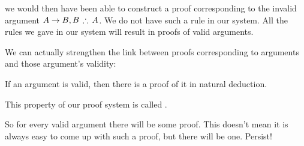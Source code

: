 	we would then have been able to construct a proof corresponding to the invalid argument $A\eif B, B\,\therefore\, A$.
We do not have such a rule in our system. All the rules we gave in our system will result in proofs of valid arguments.


We can actually strengthen the link between proofs corresponding to arguments and those argument's validity:
\begin{highlighted}
If an argument is valid, then there is a proof of it in natural deduction.
\end{highlighted}
This property of our proof system is called .

So for every valid argument there will be some proof. This doesn't mean it is always easy to come up with such a proof, but there will be one. Persist!






